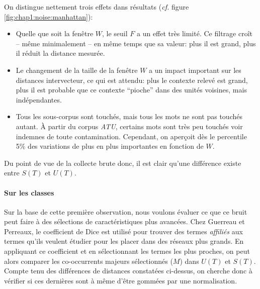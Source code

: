 On distingue nettement trois effets dans résultats (\textit{cf.} figure \ref{fig:chap1:noise:manhattan}):
\begin{itemize}
    \item Quelle que soit la fenêtre $W$, le seuil $F$ a un effet très limité. Ce filtrage croît -- même minimalement -- en même temps que sa valeur: plus il est grand, plus il réduit la distance mesurée.
    \item Le changement de la taille de la fenêtre $W$ a un impact important sur les distances intervecteur, ce qui est attendu: plus le contexte relevé est grand, plus il est probable que ce contexte \enquote{pioche} dans des unités voisines, mais indépendantes.
    \item Tous les sous-corpus sont touchés, mais tous les mots ne sont pas touchés autant. À partir du corpus \textit{ATU}, certains mots sont très peu touchés voir indemnes de toute contamination. Cependant, on aperçoit dès le percentile 5\% des variations de plus en plus importantes en fonction de $W$.
\end{itemize}

Du point de vue de la collecte brute donc, il est clair qu'une différence existe entre $S(T)$ et $U(T)$.

\paragraph{Sur les classes}
\label{sub:major-co-occurrences}

Sur la base de cette première observation, nous voulons évaluer ce que ce bruit peut faire à des sélections de caractéristiques plus avancées. Chez Guerreau et Perreaux, le coefficient de Dice est utilisé pour trouver des termes \textit{affiliés} aux termes qu'ils veulent étudier pour les placer dans des réseaux plus grands. En appliquant ce coefficient et en sélectionnant les termes les plus proches, on peut alors comparer les co-occurrents majeurs sélectionnés ($M$) dans $U(T)$ et $S(T)$. Compte tenu des différences de distances constatées ci-dessus, on cherche donc à vérifier si ces dernières sont à même d'être gommées par une normalisation. 

